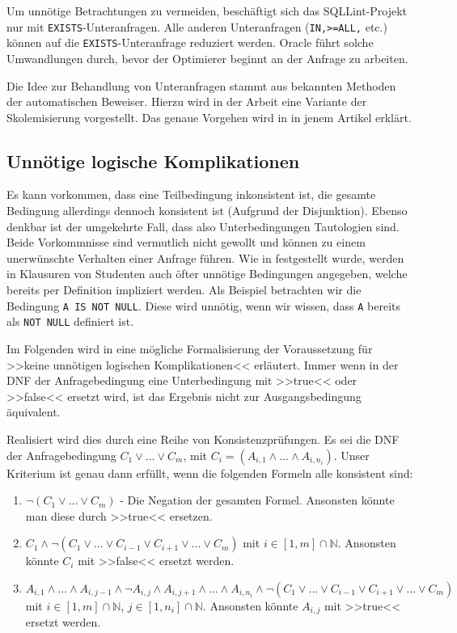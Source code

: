 Um unnötige Betrachtungen zu vermeiden, beschäftigt sich das SQLLint-Projekt nur mit \verb|EXISTS|-Unteranfragen. Alle anderen Unteranfragen (\verb|IN,>=ALL,| etc.) können auf die \verb|EXISTS|-Unteranfrage reduziert werden. Oracle führt solche Umwandlungen durch, bevor der Optimierer beginnt an der Anfrage zu arbeiten.

Die Idee zur Behandlung von Unteranfragen stammt aus bekannten Methoden der automatischen Beweiser. Hierzu wird in der Arbeit \cite{brass1} eine Variante der Skolemisierung vorgestellt. Das genaue Vorgehen wird in in jenem Artikel erklärt.

\subsection{Unnötige logische Komplikationen}

Es kann vorkommen, dass eine Teilbedingung inkonsistent ist, die gesamte Bedingung allerdings dennoch konsistent ist (Aufgrund der Disjunktion). Ebenso denkbar ist der umgekehrte Fall, dass also Unterbedingungen Tautologien sind. Beide Vorkommnisse sind vermutlich nicht gewollt und können zu einem unerwünschte Verhalten einer Anfrage führen. Wie in \cite{brass2} festgestellt wurde, werden in Klausuren von Studenten auch öfter unnötige Bedingungen angegeben, welche bereits per Definition impliziert werden. Als Beispiel betrachten wir die Bedingung \verb|A IS NOT NULL|. Diese wird unnötig, wenn wir wissen, dass \verb|A| bereits als \verb|NOT NULL| definiert ist.

Im Folgenden wird in \cite{brass2} eine mögliche Formalisierung der Voraussetzung für >>keine unnötigen logischen Komplikationen<< erläutert. Immer wenn in der DNF der Anfragebedingung eine Unterbedingung mit >>true<< oder >>false<< ersetzt wird, ist das Ergebnis nicht zur Ausgangsbedingung äquivalent.

Realisiert wird dies durch eine Reihe von Konsistenzprüfungen. Es sei die DNF der Anfragebedingung $C_1\vee ...\vee C_m$, mit $C_i=(A_{i,1}\wedge ...\wedge A_{i,n_i})$. Unser Kriterium ist genau dann erfüllt, wenn die folgenden Formeln alle konsistent sind:

\begin{enumerate}
\item $\neg(C_1 \vee ... \vee C_m)$ - Die Negation der gesamten Formel. Ansonsten könnte man diese durch >>true<< ersetzen.
\item $C_1 \wedge \neg(C_1 \vee ... \vee C_{i-1} \vee C_{i+1} \vee ... \vee C_m)$ mit $i\in [1,m]\cap \mathbb{N}$. Ansonsten könnte $C_i$ mit >>false<< ersetzt werden.
\item  $A_{i,1} \wedge ... \wedge A_{i,j-1} \wedge  \neg A_{i,j} \wedge A_{i,j+1} \wedge ... \wedge A_{i,n_i} \wedge \neg(C_1 \vee ... \vee C_{i-1} \vee C_{i+1} \vee ... \vee C_m)$ mit $i\in [1,m] \cap \mathbb{N}$, $j\in [1,n_i]\cap \mathbb{N}$. Ansonsten könnte $A_{i,j}$ mit >>true<< ersetzt werden.
\end{enumerate}

